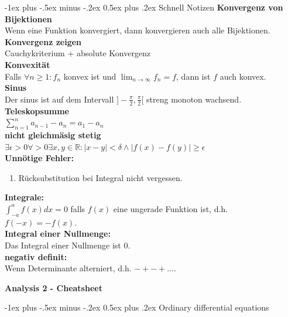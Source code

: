\documentclass[10pt,landscape]{article}
\makeatletter
\renewcommand{\section}{\@startsection{section}{1}{0mm}%
                                {-1ex plus -.5ex minus -.2ex}%
                                {0.5ex plus .2ex}%
                                {\normalfont\large\bfseries}}
\makeatother
\begin{document}
\begin{multicols}{3}
\section{Schnell Notizen}
\textbf{Konvergenz von Bijektionen}\\
Wenn eine Funktion konvergiert, dann konvergieren auch alle Bijektionen.\\
\textbf{Konvergenz zeigen}\\
Cauchykriterium + absolute Konvergenz\\
\textbf{Konvexität}\\
Falls $\forall n \geq 1: f_n$ konvex ist und $\lim_{n \rightarrow \infty} f_n = f$, dann ist $f$ auch konvex.\\
\textbf{Sinus}\\
Der sinus ist auf dem Intervall $]-\frac{\pi}{2},\frac{\pi}{2}[$ streng monoton wachsend.\\
\textbf{Teleskopsumme}\\
$\sum_{n = 1}^{n} a_{n - 1} - a_{n} = a_1 - a_n$\\
\textbf{nicht gleichmäsig stetig}\\
$\exists\epsilon > 0 \forall > 0 \exists x,y \in \mathbb{R}: |x - y| < \delta \land |f(x) - f(y)| \geq \epsilon$\\
\textbf{Unnötige Fehler:}
\begin{enumerate}
        \item Rücksubstitution bei Integral nicht vergessen.
\end{enumerate}
\textbf{Integrale:}\\
$\int_{-a}^{a} f(x) dx = 0$ falls $f(x)$ eine ungerade Funktion ist, d.h. $f(-x) = -f(x)$.\\
\textbf{Integral einer Nullmenge:}\\
Das Integral einer Nullmenge ist 0.\\
\textbf{negativ definit:}\\
Wenn Determinante alterniert, d.h. $- + - + \dots$.
\newpage
\begin{center}
        \Large{\textbf{Analysis 2 - Cheatsheet}} \\
\end{center}
\section{Ordinary differential equations}

\end{multicols}
\end{document}
